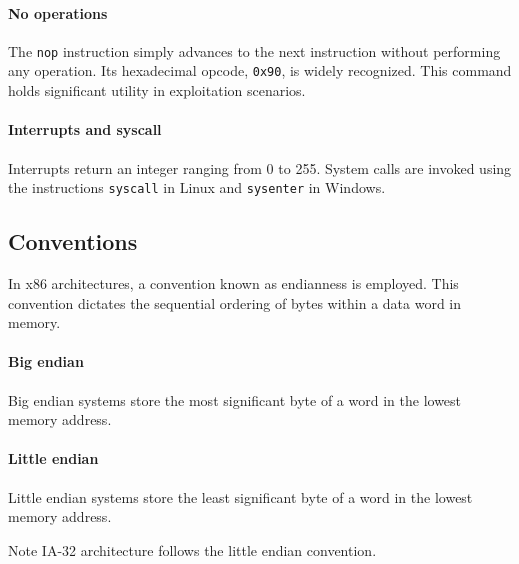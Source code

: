 \paragraph*{No operations}
The \texttt{nop} instruction simply advances to the next instruction without performing any operation. 
Its hexadecimal opcode, \texttt{0x90}, is widely recognized. 
This command holds significant utility in exploitation scenarios.

\paragraph*{Interrupts and syscall}
Interrupts return an integer ranging from 0 to 255. 
System calls are invoked using the instructions \texttt{syscall} in Linux and \texttt{sysenter} in Windows.

\subsection{Conventions}
In x86 architectures, a convention known as endianness is employed. 
This convention dictates the sequential ordering of bytes within a data word in memory.

\paragraph*{Big endian}
Big endian systems store the most significant byte of a word in the lowest memory address.

\paragraph*{Little endian}
Little endian systems store the least significant byte of a word in the lowest memory address.

Note IA-32 architecture follows the little endian convention.